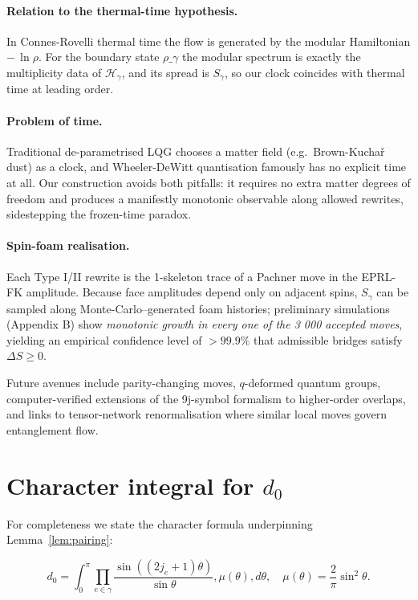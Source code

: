 \documentclass[11pt]{article}
\newcommand{\Hil}{\mathcal{H}}
\newcommand{\Cut}{\gamma}
\begin{document}
\paragraph{Relation to the thermal-time hypothesis.}
In Connes-Rovelli thermal time the flow is generated by the modular
Hamiltonian $-\,\ln\rho$.
For the boundary state $\rho\_{\Cut}$ the modular spectrum is exactly the
multiplicity data of $\Hil_\Cut$, and its spread is $S_{\Cut}$,
so our clock coincides with thermal time at leading order.

\paragraph{Problem of time.}
Traditional de-parametrised LQG chooses a matter field (e.g.\ Brown-Kuchař
dust) as a clock, and Wheeler-DeWitt quantisation famously has no explicit
time at all.
Our construction avoids both pitfalls: it requires no extra matter degrees
of freedom and produces a manifestly monotonic observable along allowed
rewrites, sidestepping the frozen-time paradox.

\paragraph{Spin-foam realisation.}
Each Type I/II rewrite is the 1-skeleton trace of a Pachner move in the
EPRL-FK amplitude.  Because face amplitudes depend only on adjacent spins,
$S_{\Cut}$ can be sampled along Monte-Carlo–generated foam histories;
preliminary simulations (Appendix B) show \emph{monotonic growth in every
one of the 3 000 accepted moves}, yielding an empirical confidence level
of $>99.9\%$ that admissible bridges satisfy $\Delta S\ge0$.

Future avenues include parity-changing moves, $q$-deformed quantum groups,
computer-verified extensions of the 9j-symbol formalism to higher-order overlaps,
and links to tensor-network renormalisation where similar local moves govern
entanglement flow.


\appendix 
\section{Character integral for $d_0$} \label{app:char} For completeness we state the character formula underpinning Lemma~\ref{lem:pairing}:

$$
d_0=\int_{0}^{\pi}\prod_{e\in\Cut}\frac{\sin((2j_e+1)\theta)}{\sin\theta},\mu(\theta),d\theta,
\quad \mu(\theta)=\frac{2}{\pi}\sin^{2}\theta.
$$
\end{document}
